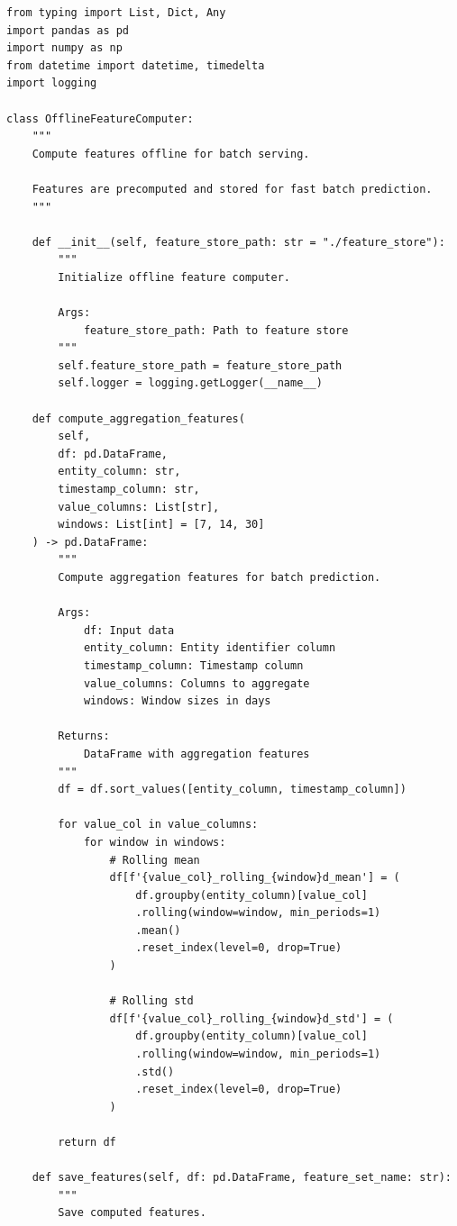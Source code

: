 \begin{lstlisting}[style=python, caption={Offline Feature Computation for Batch Serving}]
from typing import List, Dict, Any
import pandas as pd
import numpy as np
from datetime import datetime, timedelta
import logging

class OfflineFeatureComputer:
    """
    Compute features offline for batch serving.

    Features are precomputed and stored for fast batch prediction.
    """

    def __init__(self, feature_store_path: str = "./feature_store"):
        """
        Initialize offline feature computer.

        Args:
            feature_store_path: Path to feature store
        """
        self.feature_store_path = feature_store_path
        self.logger = logging.getLogger(__name__)

    def compute_aggregation_features(
        self,
        df: pd.DataFrame,
        entity_column: str,
        timestamp_column: str,
        value_columns: List[str],
        windows: List[int] = [7, 14, 30]
    ) -> pd.DataFrame:
        """
        Compute aggregation features for batch prediction.

        Args:
            df: Input data
            entity_column: Entity identifier column
            timestamp_column: Timestamp column
            value_columns: Columns to aggregate
            windows: Window sizes in days

        Returns:
            DataFrame with aggregation features
        """
        df = df.sort_values([entity_column, timestamp_column])

        for value_col in value_columns:
            for window in windows:
                # Rolling mean
                df[f'{value_col}_rolling_{window}d_mean'] = (
                    df.groupby(entity_column)[value_col]
                    .rolling(window=window, min_periods=1)
                    .mean()
                    .reset_index(level=0, drop=True)
                )

                # Rolling std
                df[f'{value_col}_rolling_{window}d_std'] = (
                    df.groupby(entity_column)[value_col]
                    .rolling(window=window, min_periods=1)
                    .std()
                    .reset_index(level=0, drop=True)
                )

        return df

    def save_features(self, df: pd.DataFrame, feature_set_name: str):
        """
        Save computed features.


\end{lstlisting}
